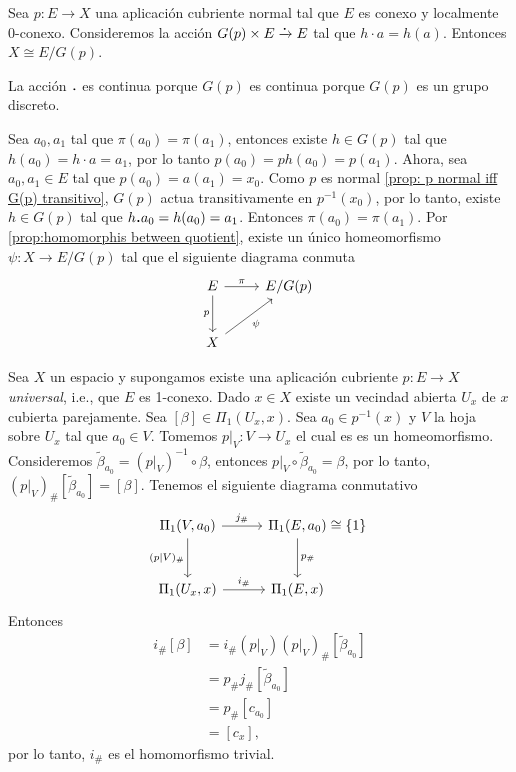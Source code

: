 \begin{prop}
    Sea $p:E\to X$ una aplicación cubriente normal tal que $E$ es conexo y localmente 0-conexo. Consideremos la acción $G(p)\times E \xrightarrow{\bigdot} E$ tal que $h\cdot a=h(a)$. Entonces $X\cong E/G(p)$.
\end{prop}
\begin{dem}
    La acción $\bigdot$ es continua porque $G(p)$ es continua porque $G(p)$ es un grupo discreto.

    Sea $a_0,a_1$ tal que $\pi(a_0)=\pi(a_1)$, entonces existe $h\in G(p)$ tal que $h(a_0)=h\cdot a=a_1$, por lo tanto $p(a_0)=ph(a_0)=p(a_1)$. Ahora, sea $a_0,a_1\in E$ tal que $p(a_0)=a(a_1)=x_0$. Como $p$ es normal \ref{prop: p normal iff G(p) transitivo}, $G(p)$ actua transitivamente en $p^{-1}(x_0)$, por lo tanto, existe $h\in G(p)$ tal que $h\bigdot a_0=h(a_0)=a_1$. Entonces $\pi(a_0)=\pi(a_1)$. Por \ref{prop:homomorphis between quotient}, existe un único homeomorfismo $\psi: X\to E/G(p)$ tal que el siguiente diagrama conmuta
    \begin{equation*}
        \begin{tikzcd}[column sep = 0.85cm, row sep = 0.85cm]
            E\arrow["\pi",r]\arrow["p"',d] & E/G(p)\\
            X \arrow["\psi"', ur]
        \end{tikzcd}
    \end{equation*}
\end{dem} 
Sea $X$ un espacio y supongamos existe una aplicación cubriente $p:E\to X$ \textit{universal}, i.e., que $E$ es 1-conexo. Dado $x\in X$ existe un vecindad abierta $U_x$ de $x$ cubierta parejamente. Sea $[\beta]\in \Pi_1(U_x,x)$. Sea $a_0\in p^{-1}(x)$ y $V$ la hoja sobre $U_x$ tal que $a_0\in V$. Tomemos $p|_V:V\to U_x$ el cual es es un homeomorfismo. Consideremos $\tilde{\beta}_{a_0}=(p|_V)^{-1}\circ\beta$, entonces $p|_V\circ\tilde{\beta}_{a_0}=\beta$, por lo tanto, $(p|_V)_{\#}[\tilde{\beta}_{a_0}]=[\beta]$. Tenemos el siguiente diagrama conmutativo
\begin{equation*}
    \begin{tikzcd}[column sep=1cm, row sep =1cm]
        \Pi_1(V,a_0)\arrow[r,"j_\#"] \arrow["(p|V)_\#"',d]& \Pi_1(E,a_0) \arrow[d, "p_\#"]&[-1.2cm] \cong\{1\}\\
         \Pi_1(U_x,x)\arrow["i_\#",r] & \Pi_1(E,x)
    \end{tikzcd}
\end{equation*}
Entonces
\begin{align*}
    i_\#[\beta]&=i_\#(p|_V)(p|_V)_{\#}[\tilde{\beta}_{a_0}]\\
    &=p_\#j_\#[\tilde{\beta}_{a_0}]\\
    &=p_\#[c_{a_0}]\\
    &=[c_{x}],
\end{align*}
por lo tanto, $i_\#$ es el homomorfismo trivial.

